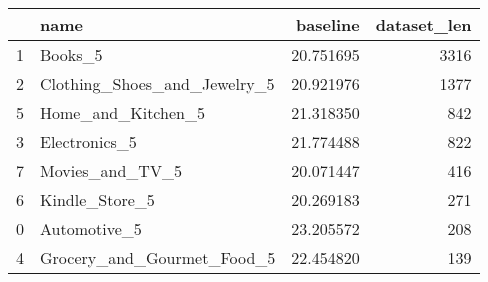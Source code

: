 \begin{tabular}{llrr}
\toprule
{} &                          name &   baseline &  dataset\_len \\
\midrule
1 &                       Books\_5 &  20.751695 &         3316 \\
2 &  Clothing\_Shoes\_and\_Jewelry\_5 &  20.921976 &         1377 \\
5 &            Home\_and\_Kitchen\_5 &  21.318350 &          842 \\
3 &                 Electronics\_5 &  21.774488 &          822 \\
7 &               Movies\_and\_TV\_5 &  20.071447 &          416 \\
6 &                Kindle\_Store\_5 &  20.269183 &          271 \\
0 &                  Automotive\_5 &  23.205572 &          208 \\
4 &    Grocery\_and\_Gourmet\_Food\_5 &  22.454820 &          139 \\
\bottomrule
\end{tabular}
